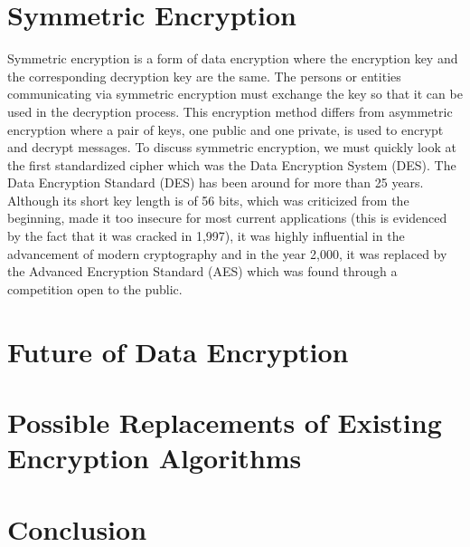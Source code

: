\documentclass[journal]{IEEEtran}
\begin{document}
\section{\textbf{Symmetric Encryption}}
Symmetric encryption is a form of data encryption where the encryption key and the corresponding decryption key are the same. The persons or entities communicating via symmetric encryption must exchange the key so that it can be used in the decryption process. This encryption method differs from asymmetric encryption where a pair of keys, one public and one private, is used to encrypt and decrypt messages. To discuss symmetric encryption, we must quickly look at the first standardized cipher which was
the Data Encryption System (DES). \newline \newline The Data Encryption Standard (DES) has been around for more than 25 years. Although its short key length is of 56 bits, which was criticized from the beginning, made it too insecure for most current applications (this is evidenced by the fact that it was cracked in 1,997), it was highly influential in the advancement of modern cryptography and in the year 2,000, it was replaced by the Advanced Encryption Standard (AES) which was found through a competition open to the public.

\section{\textbf{Future of Data Encryption}}

\section{\textbf{Possible Replacements of Existing Encryption Algorithms}}

\section{\textbf{Conclusion}}

\bigskip

\printbibliography[title={References}]
\cite{AES}
\cite{DES_past&future}
\cite{RSA_concealing}
\cite{Encryption_Study}
\cite{DES}
\cite{new_encryption}
\cite{AES_fast}
\end{document}
